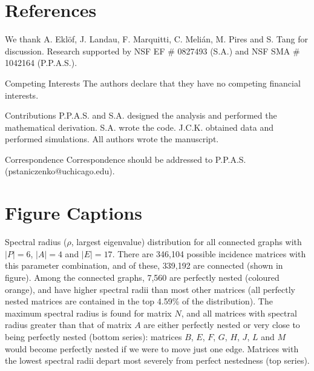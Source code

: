 \documentclass[pdftex]{nature}
\begin{document}
\section*{References}
\vspace{-0.5cm}


\vspace{-0.6cm}
\begin{addendum}
 \item We thank A. Ekl\"of, J. Landau, F. Marquitti, C. Meli\'an,
   M. Pires and S. Tang for discussion.  Research supported by NSF EF
   \# 0827493 (S.A.) and NSF SMA \# 1042164 (P.P.A.S.).
   
\vspace{-0.25cm}
 \item[Competing Interests] The authors declare that they have no
   competing financial interests.
\vspace{-0.25cm}
\item[Contributions] P.P.A.S. and S.A. designed the analysis and
  performed the mathematical derivation.  S.A. wrote the
  code. J.C.K. obtained data and performed simulations. All authors
  wrote the manuscript.
\vspace{-0.25cm}
 \item[Correspondence] Correspondence should be addressed to
   P.P.A.S. (pstaniczenko@uchicago.edu).
\end{addendum}

\section*{Figure Captions}
\vspace{-0.5cm}
Spectral radius ($\rho$, largest eigenvalue) distribution for all
connected graphs with $|P|=6$, $|A|=4$ and $|E|=17$. There are 346,104
possible incidence matrices with this parameter combination, and of
these, 339,192 are connected (shown in figure).  Among the connected
graphs, 7,560 are perfectly nested (coloured orange), and have higher
spectral radii than most other matrices (all perfectly nested matrices
are contained in the top 4.59\% of the distribution).  The maximum
spectral radius is found for matrix $N$, and all matrices with
spectral radius greater than that of matrix $A$ are either perfectly
nested or very close to being perfectly nested (bottom series):
matrices $B$, $E$, $F$, $G$, $H$, $J$, $L$ and $M$ would become
perfectly nested if we were to move just one edge.  Matrices with the
lowest spectral radii depart most severely from perfect nestedness
(top series).
\end{document}
